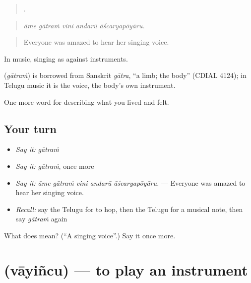 \begin{quote}
    .
\end{quote}

\begin{quote}
\emph{āme gātraṁ vini andarū āścaryapōyāru.}
\end{quote}

\begin{quote}
Everyone was amazed to hear her singing voice.
\end{quote}

In music, singing as against instruments.

\begin{cousinweb}
\textbf{} (\emph{gātraṁ}) is borrowed from Sanskrit \emph{gātra}, \textquotedblleft{}a limb; the body\textquotedblright{} (CDIAL 4124); in Telugu music it is the voice, the body's own instrument.
\end{cousinweb}

\begin{grammarlens}[title={What you've built}]
One more word for describing what you lived and felt.
\end{grammarlens}

\subsection*{Your turn}
\begin{itemize}
\raggedright
  \item \emph{Say it:} \emph{gātraṁ}
  \item \emph{Say it:} \emph{gātraṁ}, once more
  \item \emph{Say it:} \emph{āme gātraṁ vini andarū āścaryapōyāru.} — Everyone was amazed to hear her singing voice.
  \item \emph{Recall:} say the Telugu for to hop, then the Telugu for a musical note, then say \emph{gātraṁ} again
\end{itemize}

\begin{tcolorbox}[breakable,colback=teal!4,colframe=teal!35!black,title={Before you move on}]
What does  mean? (\textquotedblleft{}A singing voice\textquotedblright{}.) Say it once more.
\end{tcolorbox}
\section[\texorpdfstring{\te{వాయించు} (vāyiñcu)}{వాయించు (vāyiñcu)}]{ (vāyiñcu) — to play an instrument}

